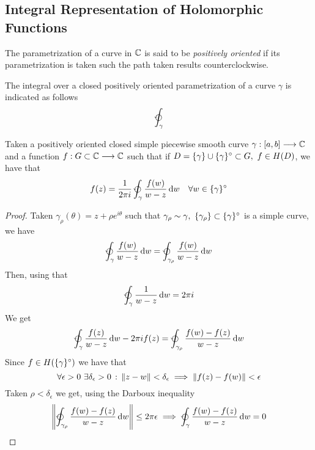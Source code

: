 \documentclass[../complete.tex]{subfiles}
\begin{document}
\subsection{Integral Representation of Holomorphic Functions}
\begin{dfn}
	The parametrization of a curve in $\mathbb{C}$ is said to be \textit{positively oriented} if its parametrization is taken such the path taken results counterclockwise.
\end{dfn}
\begin{ntn}
	The integral over a closed positively oriented parametrization of a curve $\gamma$ is indicated as follows
	\begin{equation*}
		\ointccw_\gamma
	\end{equation*}
\end{ntn}
\begin{thm}
	Taken a positively oriented closed simple piecewise smooth curve $\gamma:[a,b]\overset{}{\longrightarrow}\mathbb{C}$ and a function $f:G\subset\mathbb{C}\overset{}{\longrightarrow}\mathbb{C}$ such that if $D=\{\gamma\}\cup\intr{\{\gamma\}}\subset G,\ f\in H(D)$, we have that
	\begin{equation}
		f(z)=\frac{1}{2\pi i}\ointccw_\gamma\frac{f(w)}{w-z}\diff w\quad\forall w\in\intr{\{\gamma\}}
		\label{eq:cauchyintegral}
	\end{equation}
\end{thm}
\begin{proof}
	Taken $\gamma_\rho(\theta)=z+\rho e^{i\theta}$ such that $\gamma_\rho\sim\gamma,\ \{\gamma_\rho\}\subset\intr{\{\gamma\}}$ is a simple curve, we have
	\begin{equation*}
		\ointccw_{\gamma}\frac{f(w)}{w-z}\diff w=\ointccw_{\gamma_\rho}\frac{f(w)}{w-z}\diff w
	\end{equation*}
	Then, using that
	\begin{equation*}
		\ointccw_{\gamma}\frac{1}{w-z}\diff w=2\pi i
	\end{equation*}
	We get
	\begin{equation*}
		\ointccw_{\gamma}\frac{f(z)}{w-z}\diff w-2\pi if(z)=\ointccw_{\gamma_\rho}\frac{f(w)-f(z)}{w-z}\diff w
	\end{equation*}
	Since $f\in H(\{\gamma\}^{\circ})$ we have that
	\begin{equation*}
		\forall\epsilon>0\ \exists\delta_\epsilon>0\st\norm{z-w}<\delta_\epsilon\implies\norm{f(z)-f(w)}<\epsilon
	\end{equation*}
	Taken $\rho<\delta_\epsilon$ we get, using the Darboux inequality
	\begin{equation*}
		\norm{\ointccw_{\gamma_\rho}\frac{f(w)-f(z)}{w-z}\diff w}\le 2\pi\epsilon\implies\ointccw_{\gamma}\frac{f(w)-f(z)}{w-z}\diff w=0
	\end{equation*}
\end{proof}
\end{document}

